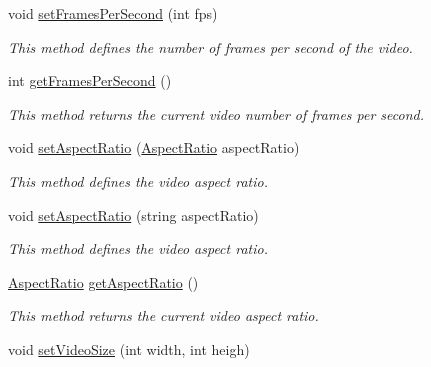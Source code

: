 \begin{DoxyCompactItemize}
void \hyperlink{classbr_1_1ufscar_1_1lince_1_1streaming_1_1AVEncoder_a14ea51da6bf535ab411677a5500e209c}{setFramesPerSecond} (int fps)
\begin{DoxyCompactList}\small\item\em This method defines the number of frames per second of the video. \item\end{DoxyCompactList}\item 
int \hyperlink{classbr_1_1ufscar_1_1lince_1_1streaming_1_1AVEncoder_a3e932dbc163c4a3207741b98d09362dc}{getFramesPerSecond} ()
\begin{DoxyCompactList}\small\item\em This method returns the current video number of frames per second. \item\end{DoxyCompactList}\item 
void \hyperlink{classbr_1_1ufscar_1_1lince_1_1streaming_1_1AVEncoder_a3c37076aa4aed91b30def7bf9495aee2}{setAspectRatio} (\hyperlink{namespacebr_1_1ufscar_1_1lince_1_1streaming_a4b30a3170430e0fc8bacd10d9c602bb8}{AspectRatio} aspectRatio)
\begin{DoxyCompactList}\small\item\em This method defines the video aspect ratio. \item\end{DoxyCompactList}\item 
void \hyperlink{classbr_1_1ufscar_1_1lince_1_1streaming_1_1AVEncoder_add827b33c1376309a7e7e0d0a48430b3}{setAspectRatio} (string aspectRatio)
\begin{DoxyCompactList}\small\item\em This method defines the video aspect ratio. \item\end{DoxyCompactList}\item 
\hyperlink{namespacebr_1_1ufscar_1_1lince_1_1streaming_a4b30a3170430e0fc8bacd10d9c602bb8}{AspectRatio} \hyperlink{classbr_1_1ufscar_1_1lince_1_1streaming_1_1AVEncoder_a52bb57fa4d0fabff9a30c73d0f37729f}{getAspectRatio} ()
\begin{DoxyCompactList}\small\item\em This method returns the current video aspect ratio. \item\end{DoxyCompactList}\item 
void \hyperlink{classbr_1_1ufscar_1_1lince_1_1streaming_1_1AVEncoder_a04f88134e8d7d941f8250685f194c7f1}{setVideoSize} (int width, int heigh)

\end{DoxyCompactItemize}
